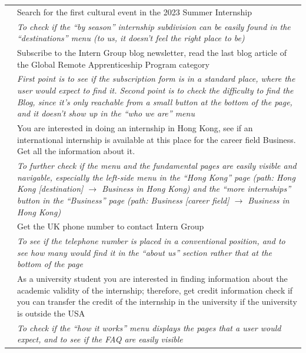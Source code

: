 \documentclass[11pt, letterpaper]{article}
\begin{document}
\begin{table}[H]
\begin{adjustbox}{width=1\textwidth}
\begin{tabularx}{1\textwidth} { 
        | c 
        | >{\centering\arraybackslash}X | }
        \hline    
        \label{Task:05}
        \multirow{2}{*}{Task 05} & Search for the first cultural event in the 2023 Summer Internship \\
        \cline{2-2}
         & \textit{To check if the “by season” internship subdivision can be easily found in the “destinations” menu (to us, it doesn’t feel the right place to be)} \\
         
        \hline    
        \label{Task:06}
        \multirow{2}{*}{Task 06} & Subscribe to the Intern Group blog newsletter, read the last blog article of the Global Remote Apprenticeship Program category \\
        \cline{2-2}
        & \textit{First point is to see if the subscription form is in a standard place, where the user would expect to find it. Second point is to check the difficulty to find the Blog, since it’s only reachable from a small button at the bottom of the page, and it doesn’t show up in the “who we are” menu} \\
         
        \hline  
        \label{Task:07}
        \multirow{2}{*}{Task 07} & You are interested in doing an internship in Hong Kong, see if an international internship is available at this place for the career field Business. Get all the information about it. \\
        \cline{2-2}
        & \textit{To further check if the menu and the fundamental pages are easily visible and navigable, especially the left-side menu in the “Hong Kong” page (path: Hong Kong [destination] $\rightarrow$ Business in Hong Kong) and the “more internships” button in the “Business” page (path: Business [career field] $\rightarrow$ Business in Hong Kong)} \\
         
        \hline 
        \label{Task:08}
        \multirow{2}{*}{Task 08} & Get the UK phone number to contact Intern Group \\
        \cline{2-2}
        & \textit{To see if the telephone number is placed in a conventional position, and to see how many would find it in the “about us” section rather that at the bottom of the page} \\
         
        \hline 
        \label{Task:09}
        \multirow{2}{*}{Task 09} & As a university student you are interested in finding information about the academic validity of the internship; therefore, get credit information check if you can transfer the credit of the internship in the university if the university is outside the USA \\
        \cline{2-2}
        & \textit{To check if the “how it works” menu displays the pages that a user would expect, and to see if the FAQ are easily visible} \\
         

\end{tabularx}
\end{adjustbox}
\end{table}
\end{document}
